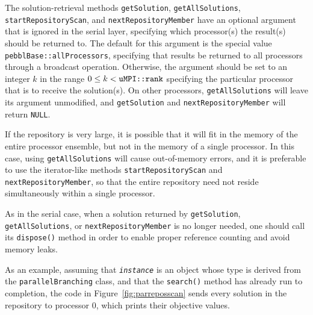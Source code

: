 The solution-retrieval methods \texttt{getSolution},
\texttt{getAllSolutions}, \texttt{startRepositoryScan}, and
\texttt{nextRepositoryMember} have an optional argument that is
ignored in the serial layer, specifying which processor(s) the result(s)
should be returned to.  The default for this argument is the special value 
\texttt{pebblBase::allProcessors}, specifying that results be returned
to all processors through a broadcast operation.  Otherwise, the
argument should be set to an integer $k$ in the range $0 \leq k <
\text{\texttt{uMPI::rank}}$ specifying the particular processor that
is to receive the solution(s).  On other processors,
\texttt{getAllSolutions} will leave its argument unmodified, and
\texttt{getSolution} and \texttt{nextRepositoryMember} will return
\texttt{NULL}.

If the repository is very large, it is possible that it will fit
in the memory of the entire processor ensemble, but not in the memory
of a single processor.  In this case, using \texttt{getAllSolutions}
will cause out-of-memory errors, and it is preferable to use the
iterator-like methods \texttt{startRepositoryScan} and
\texttt{nextRepositoryMember}, so that the entire repository need not
reside simultaneously within a single processor.  

As in the serial case, when a solution returned by \texttt{getSolution},
\texttt{getAllSolutions}, or
\texttt{nextRepositoryMember} is no longer needed, one should call its
\texttt{dispose()} method in order to enable proper reference counting and
avoid memory leaks.

As an example, assuming that \texttt{\emph{instance}} is an object
whose type is derived from the \texttt{parallelBranching} class, and
that the \texttt{search()} method has already run to completion, the
code in Figure~\ref{fig:parreposscan} sends every solution in the
repository to processor $0$, which prints their objective values.

